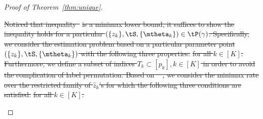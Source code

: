 \documentclass[lettersize,onecolumn,journal]{IEEEtran}
\theoremstyle{definition}
\theoremstyle{definition}
\providecommand{\DIFdeltex}[1]{{\protect\color{red}\sout{#1}}}                      %
\providecommand{\DIFdel}[1]{\texorpdfstring{\DIFdeltex{#1}}{}} %
\begin{document}
\begin{proof}[Proof of Theorem~\ref{thm:unique}]
\begin{enumerate}[wide]
\DIFdel{Noticed that inequality~}%
\DIFdel{is a minimax lower bound, it suffices to show the inequality holds for a particular $(\{z_k\}, \tS, \{\mtheta_k\}) \in \tP(\gamma)$. Specifically, we consider the estimation problem based on a particular parameter point $(\{z_k\}, \tS, \{\mtheta_k\})$ with the following three properties:
}%
\DIFdel{for all $k \in [K]$.
Furthermore, we define a subset of indices $T_k \subset [p_k], k \in [K]$ in order to avoid the complication of label permutation. Based on \mbox{%
\citet[Proof of Theorem 6]{han2020exact}}\hspace{0pt}%
, we consider the minimax rate over the restricted family of $\hat z_k$'s for which the following three conditions are satisfied:
}%
\DIFdel{for all $k \in [K]$.
}
\end{enumerate}
\end{proof}
\end{document}
